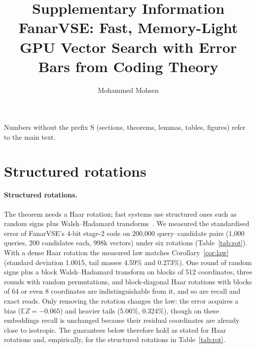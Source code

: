 \documentclass[10pt]{article}
\title{Supplementary Information\\[4pt]\large FanarVSE: Fast, Memory-Light GPU Vector Search with Error Bars from Coding Theory}
\author{Mohammed Mohsen}
\date{}
\begin{document}
\maketitle
Numbers without the prefix S (sections, theorems, lemmas, tables, figures) refer to the main text.

\section{Structured rotations}\label{sn:rot}
\paragraph{Structured rotations.} The theorem needs a Haar rotation; fast systems use structured ones such as random signs plus Walsh--Hadamard transforms~\cite{lenhardt2026rslm}. We measured the standardised error of FanarVSE's 4-bit stage-2 code on 200{,}000 query--candidate pairs (1{,}000 queries, 200 candidates each, 998k vectors) under six rotations (Table~\ref{tab:rot}). With a dense Haar rotation the measured law matches Corollary~\ref{cor:law} (standard deviation 1.0015, tail masses 4.59\% and 0.273\%). One round of random signs plus a block Walsh--Hadamard transform on blocks of 512 coordinates, three rounds with random permutations, and block-diagonal Haar rotations with blocks of 64 or even 8 coordinates are indistinguishable from it, and so are recall and exact reads. Only removing the rotation changes the law: the error acquires a bias ($\mathbb{E}Z=-0.065$) and heavier tails (5.06\%, 0.324\%), though on these embeddings recall is unchanged because their residual coordinates are already close to isotropic. The guarantees below therefore hold as stated for Haar rotations and, empirically, for the structured rotations in Table~\ref{tab:rot}.
\end{document}
